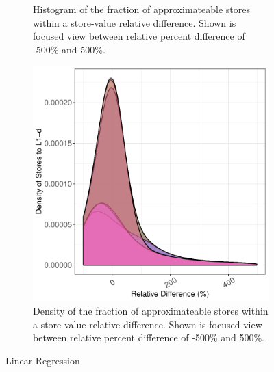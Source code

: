 \begin{figure}[htbp]
\begin{subfigure}{0.33\textwidth}
		\caption{Histogram of the fraction of approximateable stores within a store-value relative difference. Shown is focused view between relative percent difference of -500\% and 500\%.}
	\end{subfigure}
	\begin{subfigure}{0.33\textwidth}
		\centering
		\includegraphics[scale=0.4]{graphs/linear_regression/narrow_dist.pdf}
		\caption{Density of the fraction of approximateable stores within a store-value relative difference. Shown is focused view between relative percent difference of -500\% and 500\%.}
	\end{subfigure}
\caption{Linear Regression} %
\label{fig:linear_regression_valsim}
\end{figure}

